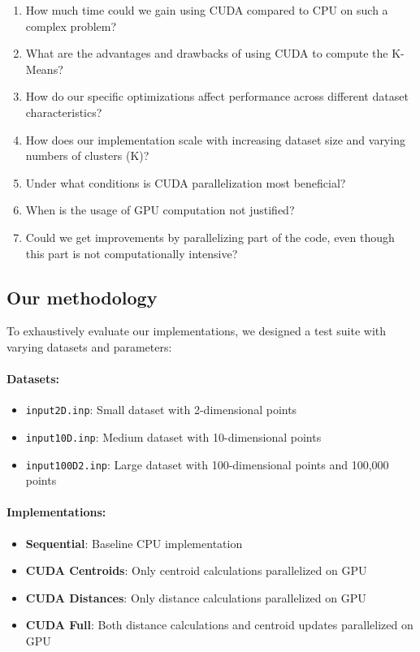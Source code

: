 \documentclass[sigconf]{acmart}
\begin{document}
\begin{enumerate} 
    \item How much time could we gain using CUDA compared to CPU on such a complex problem? 
    \item What are the advantages and drawbacks of using CUDA to compute the K-Means? 
    \item How do our specific optimizations affect performance across different dataset characteristics?
    \item How does our implementation scale with increasing dataset size and varying numbers of clusters (K)? 
    \item Under what conditions is CUDA parallelization most beneficial?
    \item When is the usage of GPU computation not justified?
    \item Could we get improvements by parallelizing part of the code, even though this part is not computationally intensive? 
\end{enumerate}

\subsection{Our methodology}


To exhaustively evaluate our implementations, we designed a test suite with varying datasets and parameters:

\paragraph{Datasets:} 
\begin{itemize}
    \item \texttt{input2D.inp}: Small dataset with 2-dimensional points
    \item \texttt{input10D.inp}: Medium dataset with 10-dimensional points
    \item \texttt{input100D2.inp}: Large dataset with 100-dimensional points and 100,000 points
\end{itemize}

\paragraph{Implementations:} 
\begin{itemize}
    \item \textbf{Sequential}: Baseline CPU implementation
    \item \textbf{CUDA Centroids}: Only centroid calculations parallelized on GPU
    \item \textbf{CUDA Distances}: Only distance calculations parallelized on GPU
    \item \textbf{CUDA Full}: Both distance calculations and centroid updates parallelized on GPU
\end{itemize}
\end{document}
